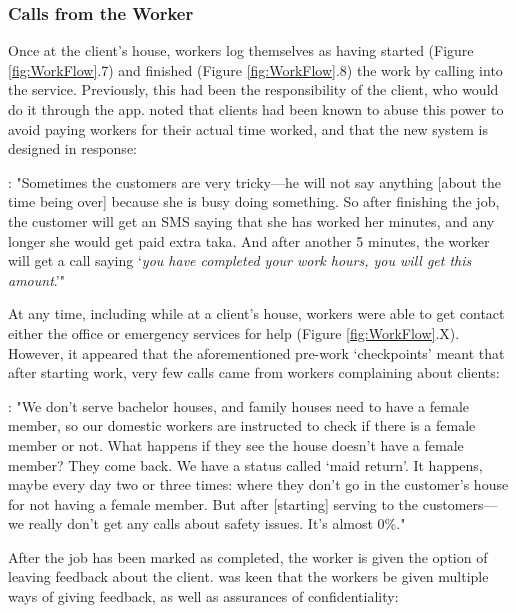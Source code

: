 \subsubsection{Calls from the Worker}

Once at the client's house, workers log themselves as having started (Figure \ref{fig:WorkFlow}.7) and finished (Figure \ref{fig:WorkFlow}.8) the work by calling into the service. Previously, this had been the responsibility of the client, who would do it through the app. \NGOOne{} noted that clients had been known to abuse this power to avoid paying workers for their actual time worked, and that the new system is designed in response:

\begin{displayquote}
\textbf{\NGOOne{}}: "Sometimes the customers are very tricky---he will not say anything [about the time being over] because she is busy doing something. So after finishing the job, the customer will get an SMS saying that she has worked her minutes, and any longer she would get paid extra taka. And after another 5 minutes, the worker will get a call saying `\textit{you have completed your work hours, you will get this amount}.’"
\end{displayquote}

At any time, including while at a client's house, workers were able to get contact either the \PC{} office or emergency services for help (Figure \ref{fig:WorkFlow}.X). However, it appeared that the aforementioned pre-work `checkpoints' meant that after starting work, very few calls came from workers complaining about clients:

\begin{displayquote}
\textbf{\PCOne{}}: "We don’t serve bachelor houses, and family houses need to have a female member, so our domestic workers are instructed to check if there is a female member or not. What happens if they see the house doesn't have a female member? They come back. We have a status called `maid return’. It happens, maybe every day two or three times: where they don’t go in the customer's house for not having a female member. But after [starting] serving to the customers---we really don’t get any calls about safety issues. It’s almost 0\%."
\end{displayquote}

After the job has been marked as completed, the worker is given the option of leaving feedback about the client. \NGOOne{} was keen that the workers be given multiple ways of giving feedback, as well as assurances of confidentiality:

